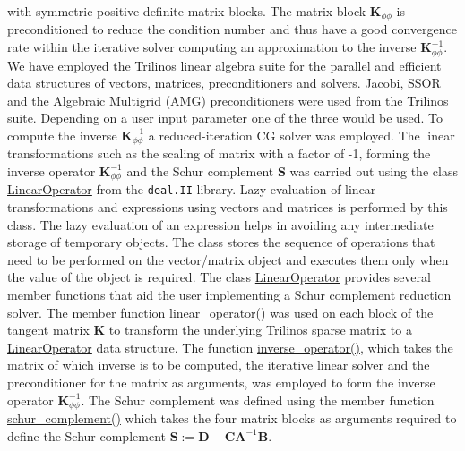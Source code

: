 with symmetric positive-definite matrix blocks. The matrix block $\mathbf{K}_{\phi \phi}$ is preconditioned to reduce the condition number and thus have a good convergence rate within the iterative solver computing an approximation to the inverse $\mathbf{K}_{\phi \phi}^{-1}$. We have employed the Trilinos \cite{trilinos} linear algebra suite for the parallel and efficient data structures of vectors, matrices, preconditioners and solvers. Jacobi, SSOR and the Algebraic Multigrid (AMG) \cite{gee2006ml} preconditioners were used from the Trilinos suite. Depending on a user input parameter one of the three would be used. To compute the inverse $\mathbf{K}_{\phi \phi}^{-1}$ a reduced-iteration CG solver was employed. The linear transformations such as the scaling of matrix with a factor of -1, forming the inverse operator $\mathbf{K}_{\phi \phi}^{-1}$ and the Schur complement $\mathbf{S}$ was carried out using the class \href{https://www.dealii.org/current/doxygen/deal.II/classLinearOperator.html}{LinearOperator} from the \texttt{deal.II} library. Lazy evaluation of linear transformations and expressions using vectors and matrices is performed by this class. The lazy evaluation of an expression helps in avoiding any intermediate storage of temporary objects. The class stores the sequence of operations that need to be performed on the vector/matrix object and executes them only when the value of the object is required. The class \href{https://www.dealii.org/current/doxygen/deal.II/classLinearOperator.html}{LinearOperator} provides several member functions that aid the user implementing a Schur complement reduction solver. The member function \href{https://www.dealii.org/current/doxygen/deal.II/group__TrilinosWrappers.html#gaf2a467ed50213dea8c580b67ee466c7c}{linear\_operator()} was used on each block of the tangent matrix $\mathbf{K}$ to transform the underlying Trilinos sparse matrix to a \href{https://www.dealii.org/current/doxygen/deal.II/classLinearOperator.html}{LinearOperator} data structure. The function \href{https://www.dealii.org/current/doxygen/deal.II/group__LAOperators.html#ga87e38fbde431397c069a88692bd24ae7}{inverse\_operator()}, which takes the matrix of which inverse is to be computed, the iterative linear solver and the preconditioner for the matrix as arguments, was employed to form the inverse operator $\mathbf{K}_{\phi \phi}^{-1}$. The Schur complement was defined using the member function \href{https://www.dealii.org/current/doxygen/deal.II/group__LAOperators.html#ga76acca911f21089cd3bb385d20ccc995}{schur\_complement()} which takes the four matrix blocks as arguments required to define the Schur complement $\mathbf{S} := \mathbf{D} - \mathbf{C} \mathbf{A}^{-1} \mathbf{B}$. \par 

